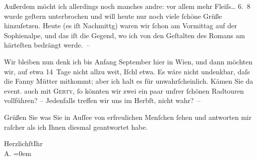                Außerdem {\pb}möcht ich allerdings noch manches andre: vor
               allem mehr Fleiſs{\dots}\pend
           \vspace{1em}
\pstart
           \raggedleft{}6. 8\pend
           \vspace{0.5em}
\pstart
           wurde geſtern unterbrochen und will heute nur noch viele{ }ſchöne Grüße hinzuſetzen.
               Heute (es iſt Nachmittg) waren wir{ }ſchon am Vormittag auf
               der Sophienalpe, und das iſt die Gegend, wo ich
               von den Geſtalten des Romans
               am härteſten bedrängt werde. –\pend
           
\pstart
           Wir bleiben nun denk ich bis Anfang September hier in Wien, und dann möchten wir, auf etwa 14 Tage nicht allzu weit,
                  Iſchl etwa. Es {\pb}wäre nicht undenkbar, daſs die Fanny Mütter
               mitkommt; aber ich halt es für unwahrſcheinlich. Kämen Sie da{\geminationn} event. auch mit \textsc{Gerty},{ }ſo könnten wir zwei ein paar unſrer{ }ſchönen Radtouren vollführen? – Jedenfalls
               treffen wir uns im Herbſt, nicht wahr? –\pend
           
\pstart
           Grüßen Sie was Sie in Auſſee von erfreulichen
               Menſchen{ }ſehen und antworten mir raſcher als ich Ihnen diesmal geantwortet habe.\pend
           
\pstart
           Herzlichſt\hspace*{1.5em}Ihr{\\[\baselineskip]}\spacefill\mbox{A.}\pend
           \leftskip=0em{}\endnumbering{}  \newcommand{\dateiname}{L01422}\newcommand{\titel}{Arthur Schnitzler an Hugo von Hofmannsthal, 5. – 6. 8. 1904}\newcommand{\editorInnen}{Martin Anton Müller und Gerd-Hermann Susen}
